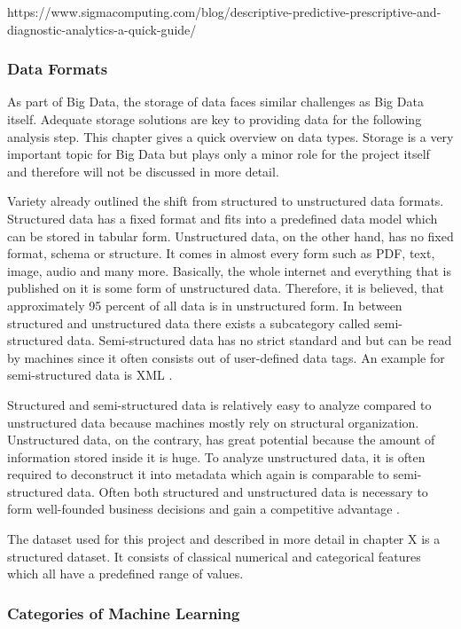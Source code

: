 https://www.sigmacomputing.com/blog/descriptive-predictive-prescriptive-and-diagnostic-analytics-a-quick-guide/

\subsubsection{Data Formats}

As part of Big Data, the storage of data faces similar challenges as Big Data itself. Adequate 
storage solutions are key to providing data for the following analysis step. This chapter gives 
a quick overview on data types. Storage is a very important topic for Big Data but plays only a 
minor role for the project itself and therefore will not be discussed in more detail.  

Variety already outlined the shift from structured to unstructured data formats. Structured data 
has a fixed format and fits into a predefined data model which can be stored in tabular form. 
Unstructured data, on the other hand, has no fixed format, schema or structure.  It comes in 
almost every form such as PDF, text, image, audio and many more. Basically, the whole internet 
and everything that is published on it is some form of unstructured data. Therefore, it is 
believed, that approximately 95 percent of all data is in unstructured form. In between structured 
and unstructured data there exists a subcategory called semi-structured data. Semi-structured 
data has no strict standard and but can be read by machines since it often consists out of 
user-defined data tags. An example for semi-structured data is XML \cite[p.2f]{Tanwar2015}. 

Structured and semi-structured data is relatively easy to analyze compared to unstructured data 
because machines mostly rely on structural organization. Unstructured data, on the contrary, has 
great potential because the amount of information stored inside it is huge. To analyze 
unstructured data, it is often required to deconstruct it into metadata which again is comparable 
to semi-structured data. Often both structured and unstructured data is necessary to form 
well-founded business decisions and gain a competitive advantage \cite[p.2f]{Tanwar2015}. 

The dataset used for this project and described in more detail in chapter X is a structured 
dataset. It consists of classical numerical and categorical features which all have a predefined 
range of values. 

\subsubsection{Categories of Machine Learning}

